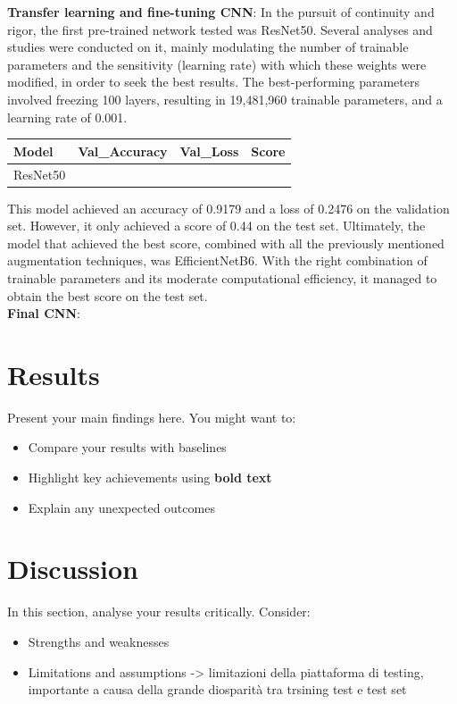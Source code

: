 \documentclass[11pt]{article}
\begin{document}
\begin{multicols}{2}
         \noindent\textbf{Transfer learning and fine-tuning CNN}: In the pursuit of continuity and rigor, the first pre-trained network tested was ResNet50. Several analyses and studies were conducted on it, mainly modulating the number of trainable parameters and the sensitivity (learning rate) with which these weights were modified, in order to seek the best results. The best-performing parameters involved freezing 100 layers, resulting in 19,481,960 trainable parameters, and a learning rate of 0.001. 
         \begin{table}[H]
            \centering
            \setlength{\tabcolsep}{3pt}
            \begin{tabularx}{\linewidth}{>{\centering\arraybackslash}p{1.9cm} >{\centering\arraybackslash}p{2.7cm} >{\centering\arraybackslash}p{1.8cm} >{\centering\arraybackslash}p{1.8cm}} 
                \toprule
                Model & Val\_Accuracy & Val\_Loss & Score\\
                \midrule
                ResNet50 & 0.9176 & 0.2476 & 0.44\\
                \bottomrule
            \end{tabularx}
            \label{tb:Measurements}
        \end{table}
        This model achieved an accuracy of 0.9179 and a loss of 0.2476 on the validation set. However, it only achieved a score of 0.44 on the test set.
        Ultimately, the model that achieved the best score, combined with all the previously mentioned augmentation techniques, was EfficientNetB6. With the right combination of trainable parameters and its moderate computational efficiency, it managed to obtain the best score on the test set.\\
        \noindent \textbf{Final CNN}:

        \section{Results}
        Present your main findings here. You might want to:
        \begin{itemize}
            \item Compare your results with baselines
            \item Highlight key achievements using \textbf{bold text}
            \item Explain any unexpected outcomes
        \end{itemize}

        \section{Discussion}
        In this section, analyse your results critically. Consider:
        \begin{itemize}
            \item Strengths and weaknesses
            \item Limitations and assumptions -> limitazioni della piattaforma di testing, importante a causa della grande diosparità tra trsining test e test set
        \end{itemize}


\end{multicols}
\end{document}
